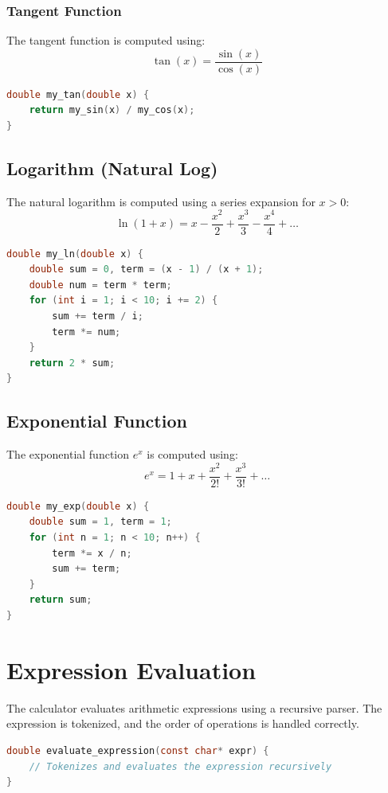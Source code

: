 \documentclass[journal]{IEEEtran}
\begin{document}
\subsubsection*{Tangent Function}
The tangent function is computed using:
\[
\tan(x) = \frac{\sin(x)}{\cos(x)}
\]
\begin{lstlisting}[language=C, caption=Tangent Function]
double my_tan(double x) {
    return my_sin(x) / my_cos(x);
}
\end{lstlisting}

\subsection*{Logarithm (Natural Log)}
The natural logarithm is computed using a series expansion for \( x > 0 \):
\[
\ln(1+x) = x - \frac{x^2}{2} + \frac{x^3}{3} - \frac{x^4}{4} + \dots
\]
\begin{lstlisting}[language=C, caption=Natural Log Function]
double my_ln(double x) {
    double sum = 0, term = (x - 1) / (x + 1);
    double num = term * term;
    for (int i = 1; i < 10; i += 2) {
        sum += term / i;
        term *= num;
    }
    return 2 * sum;
}
\end{lstlisting}

\subsection*{Exponential Function}
The exponential function \( e^x \) is computed using:
\[
e^x = 1 + x + \frac{x^2}{2!} + \frac{x^3}{3!} + \dots
\]
\begin{lstlisting}[language=C, caption=Exponential Function]
double my_exp(double x) {
    double sum = 1, term = 1;
    for (int n = 1; n < 10; n++) {
        term *= x / n;
        sum += term;
    }
    return sum;
}
\end{lstlisting}

\section*{Expression Evaluation}
The calculator evaluates arithmetic expressions using a recursive parser. The expression is tokenized, and the order of operations is handled correctly.

\begin{lstlisting}[language=C, caption=Expression Parsing]
double evaluate_expression(const char* expr) {
    // Tokenizes and evaluates the expression recursively
}
\end{lstlisting}
\end{document}
